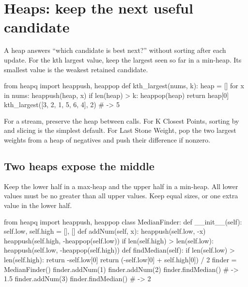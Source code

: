 \documentclass[11pt]{article}
\newcommand{\cd}[1]{{\frenchspacing\texttt{\detokenize{#1}}}}
\begin{document}
\section{Heaps: keep the next useful candidate}\label{sec:heap}
A heap answers ``which candidate is best next?'' without sorting after each update.
For the kth largest value, keep the largest \cd{k} seen so far in a min-heap.
Its smallest value is the weakest retained candidate.
\par\noindent\begin{minipage}{\linewidth}
\hypertarget{example-start-35}{}
\begin{pyex}
from heapq import heappush, heappop
def kth_largest(nums, k):
    heap = []
    for x in nums:
        heappush(heap, x)
        if len(heap) > k:
            heappop(heap)
    return heap[0]
kth_largest([3, 2, 1, 5, 6, 4], 2)    # -> 5
\end{pyex}
\hypertarget{example-end-35}{}
\end{minipage}\par
For a stream, preserve the heap between \cd{add} calls. For K Closest Points, sorting by \cd{x*x + y*y} and slicing is the simplest default.
For Last Stone Weight, pop the two largest weights from a heap of negatives and push their difference if nonzero.

\subsection{Two heaps expose the middle}
Keep the lower half in a max-heap and the upper half in a min-heap.
All lower values must be no greater than all upper values.
Keep equal sizes, or one extra value in the lower half.
\par\noindent\begin{minipage}{\linewidth}
\hypertarget{example-start-36}{}
\begin{pyex}
from heapq import heappush, heappop
class MedianFinder:
    def __init__(self):
        self.low, self.high = [], []
    def addNum(self, x):
        heappush(self.low, -x)
        heappush(self.high, -heappop(self.low))
        if len(self.high) > len(self.low):
            heappush(self.low, -heappop(self.high))
    def findMedian(self):
        if len(self.low) > len(self.high):
            return -self.low[0]
        return (-self.low[0] + self.high[0]) / 2
finder = MedianFinder()
finder.addNum(1)
finder.addNum(2)
finder.findMedian()                   # -> 1.5
finder.addNum(3)
finder.findMedian()                   # -> 2
\end{pyex}
\hypertarget{example-end-36}{}
\end{minipage}\par
\end{document}
